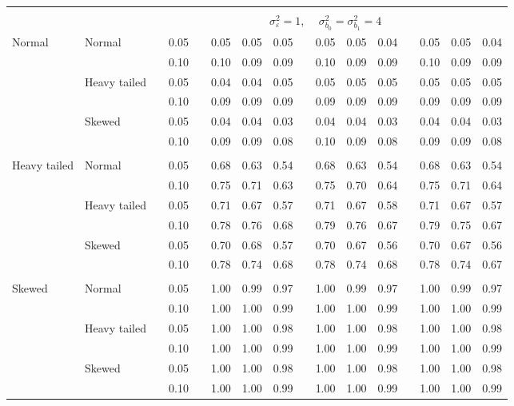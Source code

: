 \begin{table}[ht]
\begin{scriptsize}
\begin{tabular}{ll p{.1cm} c p{.1cm} rrr p{.1cm} rrr p{.1cm} rrr}
&&&&&&&&&&&&&&&\\
& && && \multicolumn{9}{c}{$\sigma_{\varepsilon}^2 = 1$, \ \ $\sigma_{b_0}^2 = \sigma_{b_1}^2 = 4$} \\ \cline{6-16}

\rowcolor{gray!20} Normal       & Normal       && 0.05 &&  0.05 & 0.05 & 0.05 && 0.05 & 0.05 & 0.04 && 0.05 & 0.05 & 0.04 \\ 
\rowcolor{gray!20}             &              && 0.10 &&  0.10 & 0.09 & 0.09 && 0.10 & 0.09 & 0.09 && 0.10 & 0.09 & 0.09 \\ 
\rowcolor{gray!20}             & Heavy tailed && 0.05 &&  0.04 & 0.04 & 0.05 && 0.05 & 0.05 & 0.05 && 0.05 & 0.05 & 0.05 \\ 
\rowcolor{gray!20}             &              && 0.10 &&  0.09 & 0.09 & 0.09 && 0.09 & 0.09 & 0.09 && 0.09 & 0.09 & 0.09 \\ 
\rowcolor{gray!20}             & Skewed       && 0.05 &&  0.04 & 0.04 & 0.03 && 0.04 & 0.04 & 0.03 && 0.04 & 0.04 & 0.03 \\ 
\rowcolor{gray!20}             &              && 0.10 &&  0.09 & 0.09 & 0.08 && 0.10 & 0.09 & 0.08 && 0.09 & 0.09 & 0.08 \\ 
             &&&&&&&&&&&&&&&\\
Heavy tailed & Normal       && 0.05 &&  0.68 & 0.63 & 0.54 && 0.68 & 0.63 & 0.54 && 0.68 & 0.63 & 0.54 \\ 
             &              && 0.10 &&  0.75 & 0.71 & 0.63 && 0.75 & 0.70 & 0.64 && 0.75 & 0.71 & 0.64 \\ 
             & Heavy tailed && 0.05 &&  0.71 & 0.67 & 0.57 && 0.71 & 0.67 & 0.58 && 0.71 & 0.67 & 0.57 \\ 
             &              && 0.10 &&  0.78 & 0.76 & 0.68 && 0.79 & 0.76 & 0.67 && 0.79 & 0.75 & 0.67 \\ 
             & Skewed       && 0.05 &&  0.70 & 0.68 & 0.57 && 0.70 & 0.67 & 0.56 && 0.70 & 0.67 & 0.56 \\ 
             &              && 0.10 &&  0.78 & 0.74 & 0.68 && 0.78 & 0.74 & 0.68 && 0.78 & 0.74 & 0.67 \\ 
             &&&&&&&&&&&&&&&\\
Skewed       & Normal       && 0.05 &&  1.00 & 0.99 & 0.97 && 1.00 & 0.99 & 0.97 && 1.00 & 0.99 & 0.97 \\ 
             &              && 0.10 &&  1.00 & 1.00 & 0.99 && 1.00 & 1.00 & 0.99 && 1.00 & 1.00 & 0.99 \\ 
             & Heavy tailed && 0.05 &&  1.00 & 1.00 & 0.98 && 1.00 & 1.00 & 0.98 && 1.00 & 1.00 & 0.98 \\ 
             &              && 0.10 &&  1.00 & 1.00 & 0.99 && 1.00 & 1.00 & 0.99 && 1.00 & 1.00 & 0.99 \\ 
             & Skewed       && 0.05 &&  1.00 & 1.00 & 0.98 && 1.00 & 1.00 & 0.98 && 1.00 & 1.00 & 0.98 \\ 
             &              && 0.10 &&  1.00 & 1.00 & 0.99 && 1.00 & 1.00 & 0.99 && 1.00 & 1.00 & 0.99 \\ 



\end{tabular}
\end{scriptsize}
\end{table}
